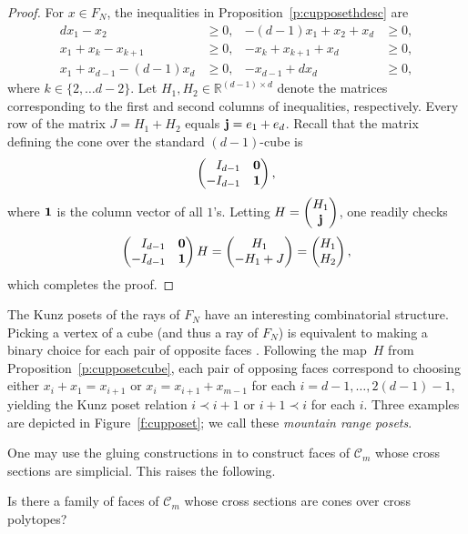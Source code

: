 \documentclass[ALCO, Unicode]{cedram}
\newcommand\RR{\mathbb{R}}
\newcommand\cC{{\mathcal C}}
\begin{document}
\begin{proof}
For $x \in F_N$, the inequalities in Proposition~\ref{p:cupposethdesc} are
\begin{align*}
dx_1 - x_2 &\ge 0,
& 
-(d-1)x_1 + x_2 + x_d &\ge 0,
\\
x_1 + x_k -x_{k+1} &\ge 0,
& 
-x_{k}  + x_{k+1} + x_{d} &\ge 0,
\\
x_1 + x_{d-1} - (d-1)x_d &\ge 0,
& 
-x_{d-1} + dx_d &\ge 0,
\end{align*}
where $k \in \{2, \ldots d - 2\}$. Let $H_1, H_2 \in \RR^{(d-1)\times d}$ denote the matrices corresponding to the first and second columns of inequalities, respectively.  Every row of the matrix $J = H_1 + H_2$ equals ${\bf j} = e_1 + e_d$.  
Recall that the matrix defining the cone over the standard $(d-1)$-cube is 
\[
\begin{pmatrix}
\hphantom{-}I_{d-1} & {\bf 0} \\ -I_{d-1} & {\bf 1}
\end{pmatrix},
\]
where $\bf{1}$ is the column vector of all $1$'s. Letting 
$H = \begin{pmatrix}
H_1 \\
{\bf j}
\end{pmatrix}$, one readily checks 
\[ 
\begin{pmatrix}
\hphantom{-}I_{d-1} & {\bf 0} \\ -I_{d-1} & {\bf 1}
\end{pmatrix} H = \begin{pmatrix}
H_1 \\
-H_1 + J 
\end{pmatrix}= \begin{pmatrix}
H_1 \\
H_2
\end{pmatrix},
\]
which completes the proof.
\end{proof}

\begin{remas}\label{r:cupposetrays}
The Kunz posets of the rays of $F_N$ have an interesting combinatorial structure. Picking a vertex of a cube (and thus a ray of $F_N$) is equivalent to making a binary choice for each pair of opposite faces \cite[Chapter~7]{ziegler}.  Following the map~$H$ from Proposition~\ref{p:cupposetcube}, each pair of opposing faces correspond to choosing either \mbox{$x_i + x_1 = x_{i+1}$} or $x_i = x_{i+1} + x_{m-1}$ for each $i = d - 1, \ldots, 2(d - 1) - 1$, yielding the Kunz poset relation $i \prec i + 1$ or $i + 1 \prec i$ for each $i$.  Three examples are depicted in Figure~\ref{f:cupposet}; 
we call these \emph{mountain range posets}.  
\end{remas}

One may use the gluing constructions in \cite[Section~6]{kunzfaces2} to construct faces of $\cC_m$ whose cross sections are simplicial.  This raises the following.  

\begin{question}\label{q:crosspolytope}
Is there a family of faces of $\cC_m$ whose cross sections are cones over cross polytopes?
\end{question}




\end{document}
